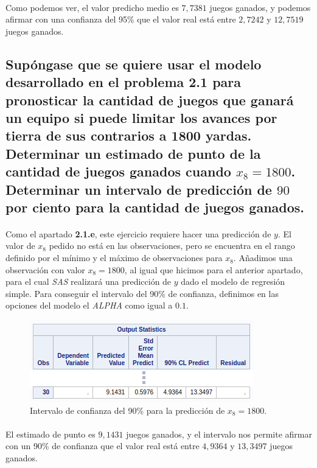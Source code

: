 \documentclass{article}
\begin{document}
  \paragraph{}
  Como podemos ver, el valor predicho medio es $7,7381$ juegos ganados, y podemos afirmar con una confianza del 95\% que el valor real está entre $2,7242$ y $12,7519$ juegos ganados.

  \subsection{Supóngase que se quiere usar el modelo desarrollado en el problema 2.1 para pronosticar la cantidad de juegos que ganará un equipo si puede limitar los avances por tierra de sus contrarios a 1800 yardas. Determinar un estimado de punto de la cantidad de juegos ganados cuando $x_8=1800$. Determinar un intervalo de predicción de $90$ por ciento para la cantidad de juegos ganados.}

  \paragraph{}
  Como el apartado \textbf{2.1.e}, este ejercicio requiere hacer una predicción de $y$. El valor de $x_8$ pedido no está en las observaciones, pero se encuentra en el rango definido por el mínimo y el máximo de observaciones para $x_8$. Añadimos una observación con valor $x_8=1800$, al igual que hicimos para el anterior apartado, para el cual \textit{SAS} realizará una predicción de $y$ dado el modelo de regresión simple. Para conseguir el intervalo del 90\% de confianza, definimos en las opciones del modelo el \textit{ALPHA} como igual a $0.1$.

  \begin{figure}[H]
    \centering
    \includegraphics[width=.5\linewidth]{img/montgomery/prediccion1800.png}
    \caption{Intervalo de confianza del 90\% para la predicción de $x_8=1800$.}
    \label{img:mont-prediccion1800}
  \end{figure}

  \paragraph{}
  El estimado de punto es $9,1431$ juegos ganados, y el intervalo nos permite afirmar con un 90\% de confianza que el valor real está entre $4,9364$ y $13,3497$ juegos ganados.
\end{document}
